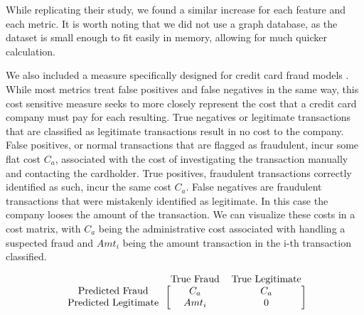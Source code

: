 \documentclass{article}
\begin{document}
While replicating their study, we found a similar increase for each feature and each metric. It is worth noting that we did not use a graph database, as the dataset is small enough to fit easily in memory, allowing for much quicker calculation. 

We also included a measure specifically designed for credit card fraud models \cite{ftc2022}. While most metrics treat false positives and false negatives in the same way, this cost sensitive measure seeks to more closely represent the cost that a credit card company must pay for each resulting. True negatives or legitimate transactions that are classified as legitimate transactions result in no cost to the company. False positives, or normal transactions that are flagged as fraudulent, incur some flat cost $C_a$, associated with the cost of investigating the transaction manually and contacting the cardholder. True positives, fraudulent transactions correctly identified as such, incur the same cost $C_a$. False negatives are fraudulent transactions that were mistakenly identified as legitimate. In this case the company looses the amount of the transaction. We can visualize these costs in a cost matrix, with $C_a$ being the administrative cost associated with handling a suspected fraud and $Amt_i$ being the amount transaction in the i-th transaction classified. 

\[
\begin{blockarray}{ccc}
& \text{True Fraud} & \text{True Legitimate} \\
\begin{block}{c[cc]}
  \text{Predicted Fraud} & C_a & C_a\\
  \text {Predicted Legitimate} & Amt_i & 0 \\
\end{block}
\end{blockarray}
\]




\end{document}
